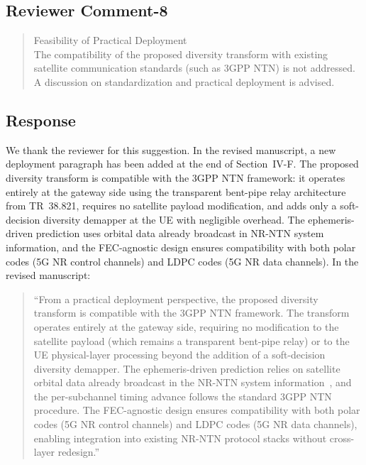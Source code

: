 \subsection{Reviewer Comment-8}



\begin{mdframed}
\begin{quote}

Feasibility of Practical Deployment \\
   The compatibility of the proposed diversity transform with existing satellite communication standards (such as 3GPP NTN) is not addressed. A discussion on standardization and practical deployment is advised.


\end{quote}

\end{mdframed}


\subsection{Response}

We thank the reviewer for this suggestion. In the revised manuscript, a new deployment paragraph has been added at the end of Section~IV-F. The proposed diversity transform is compatible with the 3GPP NTN framework: it operates entirely at the gateway side using the transparent bent-pipe relay architecture from TR~38.821, requires no satellite payload modification, and adds only a soft-decision diversity demapper at the UE with negligible overhead. The ephemeris-driven prediction uses orbital data already broadcast in NR-NTN system information, and the FEC-agnostic design ensures compatibility with both polar codes (5G NR control channels) and LDPC codes (5G NR data channels). In the revised manuscript:

\begin{quote}
``{\color{blue}From a practical deployment perspective, the proposed diversity transform is compatible with the 3GPP NTN framework. The transform operates entirely at the gateway side, requiring no modification to the satellite payload (which remains a transparent bent-pipe relay) or to the UE physical-layer processing beyond the addition of a soft-decision diversity demapper. The ephemeris-driven prediction relies on satellite orbital data already broadcast in the NR-NTN system information~\cite{3GPP38821}, and the per-subchannel timing advance follows the standard 3GPP NTN procedure. The FEC-agnostic design ensures compatibility with both polar codes (5G NR control channels) and LDPC codes (5G NR data channels), enabling integration into existing NR-NTN protocol stacks without cross-layer redesign.}''
\end{quote}

